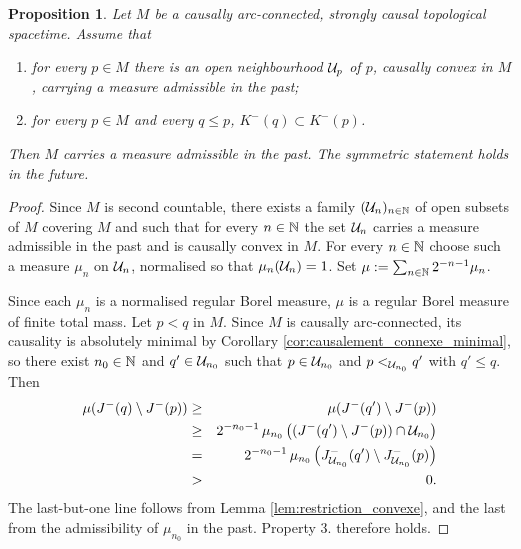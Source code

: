 \documentclass[a4paper,twoside]{article}
\newtheorem{prop}[lem]{Proposition}
\begin{document}
\begin{prop}\label{prop:mesure_dieckmann_topo} Let $M$ be a causally arc-connected, strongly causal
topological spacetime. Assume that
\begin{enumerate}[label=(\roman*)]
\item for every $p\in M$ there is an open neighbourhood $\mathcal{U}_p$ of $p$, causally convex in $M$,
carrying a measure admissible in the past;
\item for every $p\in M$ and every $q\leq p$, $K^-(q)\subset K^-(p)$.
\end{enumerate}
Then $M$ carries a measure admissible in the past. The symmetric statement holds in the future.
\end{prop}
\begin{proof}
Since $M$ is second countable, there exists a family $(\mathcal{U}_n)_{n\in \mathbb{N}}$ of open subsets of $M$ covering $M$
and such that for every $n\in \mathbb{N}$ the set $\mathcal{U}_n$ carries a measure admissible in the past and is causally convex in $M$. For every $n\in \mathbb{N}$ choose
such a measure $\mu_n$ on $\mathcal{U}_n$, normalised so that $\mu_n(\mathcal{U}_n)=1$.
Set $\mu := \sum_{n\in \mathbb{N}} 2^{-n-1} \mu_n$.

Since each $\mu_n$ is a normalised regular Borel measure, $\mu$ is a regular Borel measure of finite total mass.
Let $p<q$ in $M$. Since $M$ is causally arc-connected, its causality is absolutely minimal by
Corollary \ref{cor:causalement_connexe_minimal}, so there exist $n_0\in \mathbb{N}$ and $q'\in \mathcal{U}_{n_0}$
such that $p\in \mathcal{U}_{n_0}$ and $p<_{\mathcal{U}_{n_0}}q'$ with $q'\leq q$. Then
\begin{eqnarray*}
\mu(J^-(q)\setminus J^-(p))&\geq& \mu(J^-(q')\setminus J^-(p))\\
&\geq& 2^{-n_0-1}\,\mu_{n_0}\left((J^-(q')\setminus J^-(p))\cap \mathcal{U}_{n_0} \right)\\
&=& 2^{-n_0-1}\,\mu_{n_0}\left(J_{\mathcal{U}_{n_0}}^-(q')\setminus J_{\mathcal{U}_{n_0}}^-(p)\right)\\
&>& 0 .
\end{eqnarray*}
The last-but-one line follows from Lemma \ref{lem:restriction_convexe}, and the last from the
admissibility of $\mu_{n_0}$ in the past. Property $3.$ therefore holds.


\end{proof}
\end{document}
